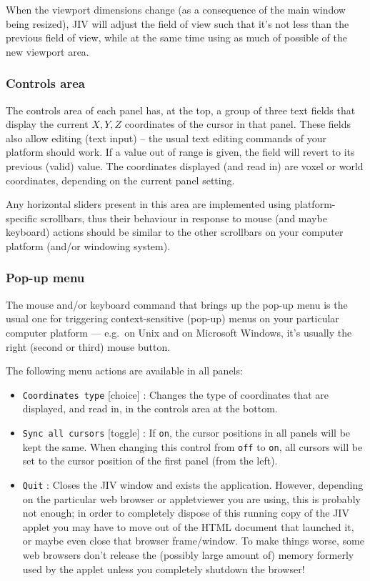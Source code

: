 When the viewport dimensions change (as a consequence of the main
window being resized), JIV will adjust the field of view such that
it's not less than the previous field of view, while at the same time
using as much of possible of the new viewport area.

\subsubsection{Controls area}
The controls area of each panel has, at the top, a group of three text
fields that display the current $X,Y,Z$ coordinates of the cursor in
that panel. These fields also allow editing (text input) -- the usual
text editing commands of your platform should work.  If a value out of
range is given, the field will revert to its previous (valid) value.
The coordinates displayed (and read in) are voxel or world
coordinates, depending on the current panel setting.

Any horizontal sliders present in this area are implemented using
platform-specific scrollbars, thus their behaviour in response to
mouse (and maybe keyboard) actions should be similar to the other
scrollbars on your computer platform (and/or windowing system).

\subsubsection{Pop-up menu}
The mouse and/or keyboard command that brings up the pop-up menu is the
usual one for triggering context-sensitive (pop-up) menus on your
particular computer platform --- e.g.\ on Unix and on Microsoft
Windows, it's usually the right (second or third) mouse button.

The following menu actions are available in all panels:
\begin{itemize}
\item \verb+Coordinates type+ [choice] : Changes the type of
  coordinates that are displayed, and read in, in the controls area at
  the bottom.
\item \verb+Sync all cursors+ [toggle] : If \verb+on+, the cursor
  positions in all panels will be kept the same. When changing this
  control from \verb+off+ to \verb+on+, all cursors will be set to the
  cursor position of the first panel (from the left).
\item \verb+Quit+ : Closes the JIV window and exists the application.
  However, depending on the particular web browser or appletviewer you
  are using, this is probably not enough; in order to completely
  dispose of this running copy of the JIV applet you may have to move
  out of the HTML document that launched it, or maybe even close that
  browser frame/window. To make things worse, some web browsers don't
  release the (possibly large amount of) memory formerly used by the
  applet unless you completely shutdown the browser!
\end{itemize}

